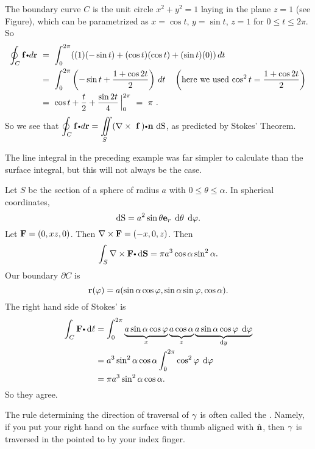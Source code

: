 \begin{solu}
 The boundary curve $C$ is the unit circle $x^2 + y^2 =1$ laying in the plane $z=1$ (see Figure), which can be
 parametrized as $x = \cos t$, $y = \sin t$, $z = 1$ for $0 \le t \le 2\pi$. So
 \begin{align*}
  \olineintvec{C}{f}{r} ~&=~ \dint_0^{2\pi} ((1)(-\sin t) + (\cos t)(\cos t) + (\sin t)(0))\,dt\\
   &=~ \dint_0^{2\pi} \left( -\sin t + \dfrac{1+\cos 2t}{2} \right) \,dt \quad \left( \text{here we used $\cos^2 t =
   \dfrac{1+\cos 2t}{2}$} \right)\\
   &=~ \cos t + \dfrac{t}{2} + \dfrac{\sin 2t}{4}\,\Big|_0^{2\pi} ~=~ \pi ~.
 \end{align*}
 So we see that $\olineintvec{C}{f}{r}=\diint\limits_{\superficie} \Dotprod{(\curlb~{\vector{f}}\,)}{\vector{n}}
 \, \d \S$, as predicted by Stokes' Theorem.
\end{solu}

The line integral in the preceding example was far simpler to calculate than the surface integral, but this will not
always be the case.


\begin{exa}
  Let $S$ be the section of a sphere of radius $a$ with $0 \leq \theta \leq \alpha$. In spherical coordinates,
  \[
    \d \S = a^2 \sin \theta \vector{e}_r \;\d \theta\;\d \varphi.
  \]
  Let $\mathbf{ F} = (0, xz, 0)$. Then $\nabla \times \mathbf{ F} = (-x, 0, z)$. Then
  \[
    \dint_S \nabla\times \vector{F}\bp \d \vector{S} = \pi a^3 \cos\alpha\sin^2 \alpha.
  \]
  Our boundary $\partial C$ is
  \[
    \mathbf{ r}(\varphi) = a(\sin \alpha\cos \varphi, \sin \alpha\sin \varphi, \cos \alpha).
  \]
  The right hand side of Stokes' is
  \begin{align*}
    \dint_C \vector{F}\bp \d \ell &= \dint_0^{2\pi}\underbrace{a\sin \alpha\cos \varphi}_{x}\underbrace{\vphantom{\varphi}a\cos\alpha}_z \underbrace{a\sin \alpha\cos\varphi\;\d \varphi}_{\d y}\\
    &= a^3\sin^2\alpha\cos\alpha\dint_0^{2\pi}\cos^2\varphi\;\d \varphi\\
    &= \pi a^3\sin^2\alpha\cos\alpha.
  \end{align*}
  So they agree.
\end{exa}


  \begin{remark}
    The rule determining the direction of traversal of $\gamma$ is often called the .
    Namely, if you put your right hand on the surface with thumb aligned with $\hat{ \mathbf{ n}}$, then $\gamma$ is traversed in the pointed to by your index finger.
  \end{remark}

